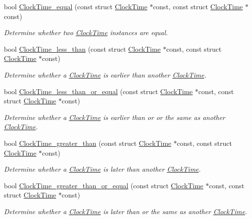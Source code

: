 \begin{DoxyCompactItemize}
bool \hyperlink{clock-time_8h_a33f1b59fd2b998d61ea80c908aeb274c}{\-Clock\-Time\-\_\-equal} (const struct \hyperlink{structClockTime}{\-Clock\-Time} $\ast$const, const struct \hyperlink{structClockTime}{\-Clock\-Time} $\ast$const)
\begin{DoxyCompactList}\small\item\em \-Determine whether two \hyperlink{structClockTime}{\-Clock\-Time} instances are equal. \end{DoxyCompactList}\item 
bool \hyperlink{clock-time_8h_a3e68308f034226dd04f361fb173ea6ac}{\-Clock\-Time\-\_\-less\-\_\-than} (const struct \hyperlink{structClockTime}{\-Clock\-Time} $\ast$const, const struct \hyperlink{structClockTime}{\-Clock\-Time} $\ast$const)
\begin{DoxyCompactList}\small\item\em \-Determine whether a \hyperlink{structClockTime}{\-Clock\-Time} is earlier than another \hyperlink{structClockTime}{\-Clock\-Time}. \end{DoxyCompactList}\item 
bool \hyperlink{clock-time_8h_a79d34170a100cdf5654080e9e1c1d7a9}{\-Clock\-Time\-\_\-less\-\_\-than\-\_\-or\-\_\-equal} (const struct \hyperlink{structClockTime}{\-Clock\-Time} $\ast$const, const struct \hyperlink{structClockTime}{\-Clock\-Time} $\ast$const)
\begin{DoxyCompactList}\small\item\em \-Determine whether a \hyperlink{structClockTime}{\-Clock\-Time} is earlier than or or the same as another \hyperlink{structClockTime}{\-Clock\-Time}. \end{DoxyCompactList}\item 
bool \hyperlink{clock-time_8h_a9e2265b76612f6f7618ede2d78f10083}{\-Clock\-Time\-\_\-greater\-\_\-than} (const struct \hyperlink{structClockTime}{\-Clock\-Time} $\ast$const, const struct \hyperlink{structClockTime}{\-Clock\-Time} $\ast$const)
\begin{DoxyCompactList}\small\item\em \-Determine whether a \hyperlink{structClockTime}{\-Clock\-Time} is later than another \hyperlink{structClockTime}{\-Clock\-Time}. \end{DoxyCompactList}\item 
bool \hyperlink{clock-time_8h_ace253f56caf8df157d630aa590b658cc}{\-Clock\-Time\-\_\-greater\-\_\-than\-\_\-or\-\_\-equal} (const struct \hyperlink{structClockTime}{\-Clock\-Time} $\ast$const, const struct \hyperlink{structClockTime}{\-Clock\-Time} $\ast$const)
\begin{DoxyCompactList}\small\item\em \-Determine whether a \hyperlink{structClockTime}{\-Clock\-Time} is later than or the same as another \hyperlink{structClockTime}{\-Clock\-Time}. \end{DoxyCompactList}\end{DoxyCompactItemize}



